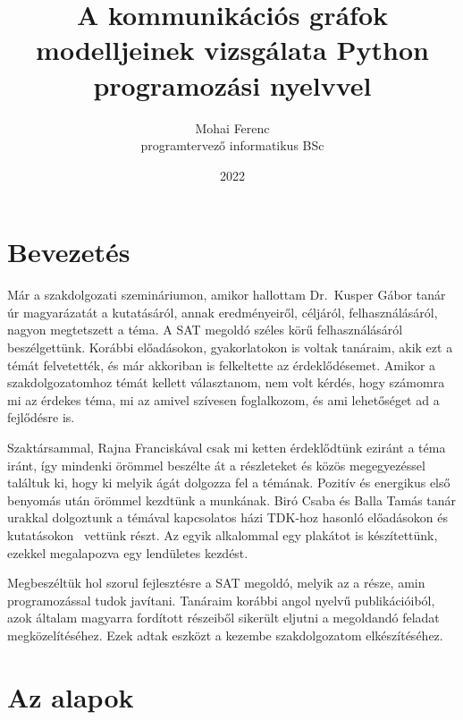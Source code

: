 \documentclass[
]{thesis-ekf}
\theoremstyle{definition}
\theoremstyle{remark}
\begin{document}
	\title{A kommunikációs gráfok modelljeinek vizsgálata Python programozási nyelvvel}
	\author{Mohai Ferenc\\programtervező informatikus BSc}
	\date{2022}
	
	\maketitle
	\tableofcontents
	
\chapter*{Bevezetés}
	Már a szakdolgozati szemináriumon, amikor hallottam Dr.~Kusper Gábor tanár úr magyarázatát a kutatásáról, annak eredményeiről, céljáról, felhasználásáról, nagyon megtetszett a téma. A \textsc{SAT} megoldó széles körű felhasználásáról beszélgettünk. Korábbi előadásokon, gyakorlatokon is voltak tanáraim, akik ezt a témát felvetették, és már akkoriban is felkeltette az érdeklődésemet. Amikor a szakdolgozatomhoz témát kellett választanom, nem volt kérdés, hogy számomra mi az érdekes téma, mi az amivel szívesen foglalkozom, és ami lehetőséget ad a fejlődésre is.

	Szaktársammal, Rajna Franciskával csak mi ketten érdeklődtünk eziránt a téma iránt, így mindenki örömmel beszélte át a részleteket és közös megegyezéssel találtuk ki, hogy ki melyik ágát dolgozza fel a témának.
	Pozitív és energikus első benyomás után örömmel kezdtünk a munkának. Biró Csaba és Balla Tamás tanár urakkal dolgoztunk a témával kapcsolatos házi \textsc{TDK}-hoz hasonló előadásokon és kutatásokon~\cite{am} vettünk részt. Az egyik alkalommal egy plakátot is készítettünk, ezekkel megalapozva egy lendületes kezdést.
	
	Megbeszéltük hol szorul fejlesztésre a \textsc{SAT} megoldó, melyik az a része, amin programozással tudok javítani. Tanáraim korábbi angol nyelvű publikációiból, azok általam magyarra fordított részeiből sikerült eljutni a megoldandó feladat megközelítéséhez. Ezek adtak eszközt a kezembe szakdolgozatom elkészítéséhez.
		
\chapter{Az alapok}
	
\end{document}
